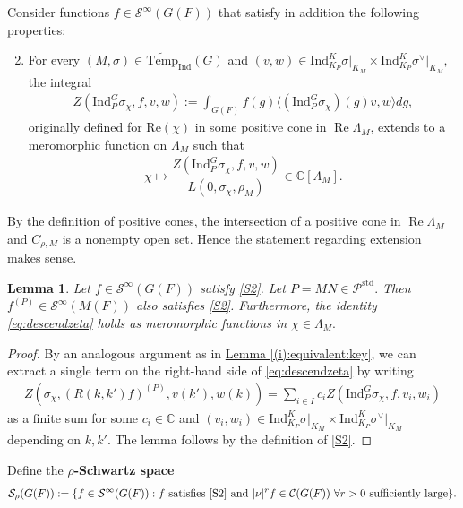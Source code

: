 \documentclass[10pt]{amsart}
\newtheorem{lemma}[theorem]{Lemma}
\theoremstyle{definition}
\numberwithin{equation}{section}
\numberwithin{equation}{subsection}
\newcommand{\Ind}{\mathrm{Ind}}
\newcommand{\CC}{\mathbb{C}}
\renewcommand{\Re}{\mathop{\mathrm{Re}}}
\begin{document}
Consider functions $f\in \mathcal{S}^\infty(G(F))$ that satisfy in addition the following properties: 
\begin{enumerate}[label=(S\text{\arabic*}), ref=S\text{\arabic*}] \setcounter{enumi}{1}
    \item\label{S2} For every $(M,\sigma)\in\widetilde{\mathrm{Temp}}_\Ind(G)$
 and $(v,w)\in\Ind_{K_P }^K\sigma\vert_{K_M }\times \Ind_{K_P }^K\sigma^\vee\vert_{K_M },$ the integral
    \begin{align*}
        Z(\mathrm{Ind}_P^G \sigma_\chi,f,v,w):= \int_{G(F)} f(g)\langle(\Ind_P^G\sigma_\chi)(g)v,w\rangle  dg,
    \end{align*}
    originally defined for $\mathrm{Re}(\chi)$ in some positive cone in $\Re\Lambda_M$, extends to a meromorphic function on $\Lambda_M$ such that 
    \begin{align*}
        \chi\mapsto \dfrac{Z(\mathrm{Ind}_P^G \sigma_\chi,f,v,w)}{L(0,\sigma_{\chi},\rho_M)} \in \mathbb{C}[\Lambda_M].
    \end{align*}
\end{enumerate}
By the definition of positive cones, the intersection of a positive cone in $\Re \Lambda_M$ and $C_{\rho,M}$ is a nonempty open set. Hence the statement regarding extension makes sense.



\begin{lemma} \label{lem:constant}
Let $f\in \mathcal{S}^\infty(G(F))$ satisfy \eqref{S2}. Let $P=MN\in \mathcal{P}^{\mathrm{std}}.$ Then $f^{(P)}\in \mathcal{S}^\infty(M(F))$ also satisfies \eqref{S2}. Furthermore, the identity \eqref{eq:descendzeta} holds as meromorphic functions in $\chi\in \Lambda_M.$
\end{lemma}
\begin{proof} By an analogous argument as in \hyperref[(i):equivalent:key]{Lemma \ref{(i):equivalent:key}}, we can extract a single term on the right-hand side of \eqref{eq:descendzeta} by writing
\begin{align*}
    Z(\sigma_\chi, (R(k,k')f)^{(P)}, v(k'), w(k))=\sum_{i\in I} c_iZ(\mathrm{Ind}_P^G \sigma_\chi,f,v_i,w_i)  
\end{align*}
as a finite sum for some $c_i\in \CC$ and $(v_i,w_i)\in  \Ind_{K_P}^K\sigma\vert_{K_M}\times \Ind_{K_P}^K\sigma^\vee\vert_{K_M}$ depending on $k,k'.$ The lemma follows by the definition of \eqref{S2}.
\end{proof}

Define the \textbf{$\rho$-Schwartz space} 
\begin{align*}
    \mathcal{S}_\rho(G(F)):=\{ f\in \mathcal{S}^\infty(G(F)): f \textrm{ satisfies } \eqref{S2} \textrm{ and } |\nu|^rf\in \mathcal{C}(G(F)) \,\,\forall r>0 \textrm{ sufficiently large}\}.
\end{align*}
\end{document}
